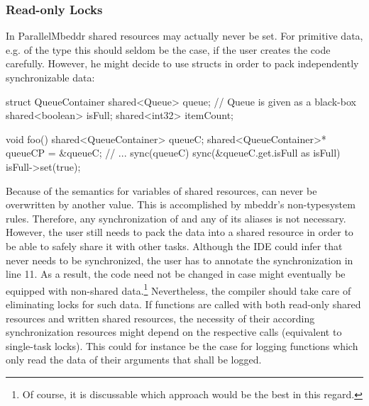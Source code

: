 \subsubsection{Read-only Locks}
In ParallelMbeddr shared resources may actually never be set. For primitive data, e.g. of the type  this should seldom be the case, if the user creates the code carefully. However, he might decide to use structs in order to pack independently synchronizable data:
\begin{ccode}
struct QueueContainer {
  shared<Queue>   queue;     // Queue is given as a black-box
  shared<boolean> isFull;
  shared<int32>   itemCount;
}

void foo() {
  shared<QueueContainer> queueC;
  shared<QueueContainer>* queueCP = &queueC;
  // ...
  sync(queueC) {
    sync(&queueC.get.isFull as isFull) {
      isFull->set(true);
    }
  }
}
\end{ccode}
Because of the semantics for variables of shared resources,  can never be overwritten by another value. This is accomplished by mbeddr's non-typesystem rules. Therefore, any synchronization of  and any of its aliases is not necessary. However, the user still needs to pack the data into a shared resource in order to be able to safely share it with other tasks. Although the IDE could infer that  never needs to be synchronized, the user has to annotate the synchronization in line 11. As a result, the code need not be changed in case  might eventually be equipped with non-shared data.\footnote{Of course, it is discussable which approach would be the best in this regard.} Nevertheless, the compiler should take care of eliminating locks for such data. If functions are called with both read-only shared resources and written shared resources, the necessity of their according synchronization resources might depend on the respective calls (equivalent to single-task locks). This could for instance be the case for logging functions which only read the data of their arguments that shall be logged.

